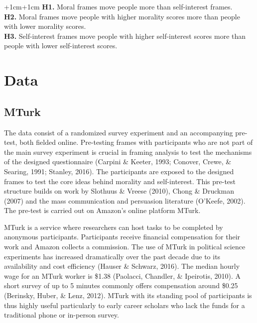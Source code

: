 \documentclass[12pt,econ]{sources/authesis}
\begin{document}
\vspace{0.3cm}
\begin{adjustwidth*}{+1cm}{+1cm}
\noindent \textbf{H1.} Moral frames move people more than self-interest frames.\\
\noindent \textbf{H2.} Moral frames move people with higher morality scores more than people with lower morality scores.\\
\noindent \textbf{H3.} Self-interest frames move people with higher self-interest scores more than people with lower self-interest scores.\\
\end{adjustwidth*}
\hypertarget{framing-data}{%
\section{Data}\label{framing-data}}

\hypertarget{framing-data-mturk}{%
\subsection{MTurk}\label{framing-data-mturk}}

The data consist of a randomized survey experiment and an accompanying pre-test, both fielded online. Pre-testing frames with participants who are not part of the main survey experiment is crucial in framing analysis to test the mechanisms of the designed questionnaire (Carpini \& Keeter, 1993; Conover, Crewe, \& Searing, 1991; Stanley, 2016). The participants are exposed to the designed frames to test the core ideas behind morality and self-interest. This pre-test structure builds on work by Slothuus \& Vreese (2010), Chong \& Druckman (2007) and the mass communication and persuasion literature (O'Keefe, 2002). The pre-test is carried out on Amazon's online platform MTurk.

MTurk is a service where researchers can host tasks to be completed by anonymous participants. Participants receive financial compensation for their work and Amazon collects a commission. The use of MTurk in political science experiments has increased dramatically over the past decade due to its availability and cost efficiency (Hauser \& Schwarz, 2016). The median hourly wage for an MTurk worker is \$1.38 (Paolacci, Chandler, \& Ipeirotis, 2010). A short survey of up to 5 minutes commonly offers compensation around \$0.25 (Berinsky, Huber, \& Lenz, 2012). MTurk with its standing pool of participants is thus highly useful particularly to early career scholars who lack the funds for a traditional phone or in-person survey.
\end{document}
